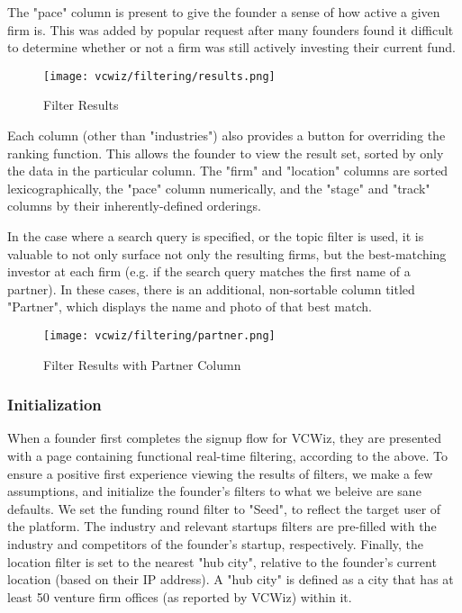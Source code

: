 The "pace" column is present to give the founder a sense of how active a given firm is. This was added by popular request after many founders found it difficult to determine whether or not a firm was still actively investing their current fund.

\begin{figure}[ht]
  \texttt{[image: vcwiz/filtering/results.png]}
  \centering
  \caption*{Filter Results}
\end{figure}

Each column (other than "industries") also provides a button for overriding the ranking function. This allows the founder to view the result set, sorted by only the data in the particular column. The "firm" and "location" columns are sorted lexicographically, the "pace" column numerically, and the "stage" and "track" columns by their inherently-defined orderings.

In the case where a search query is specified, or the topic filter is used, it is valuable to not only surface not only the resulting firms, but the best-matching investor at each firm (e.g. if the search query matches the first name of a partner). In these cases, there is an additional, non-sortable column titled "Partner", which displays the name and photo of that best match.

\begin{figure}[ht]
  \texttt{[image: vcwiz/filtering/partner.png]}
  \centering
  \caption*{Filter Results with Partner Column}
\end{figure}

\subsubsection{Initialization}

When a founder first completes the signup flow for VCWiz, they are presented with a page containing functional real-time filtering, according to the above. To ensure a positive first experience viewing the results of filters, we make a few assumptions, and initialize the founder's filters to what we beleive are sane defaults. We set the funding round filter to "Seed", to reflect the target user of the platform. The industry and relevant startups filters are pre-filled with the industry and competitors of the founder's startup, respectively. Finally, the location filter is set to the nearest "hub city", relative to the founder's current location (based on their IP address). A "hub city" is defined as a city that has at least 50 venture firm offices (as reported by VCWiz) within it.

